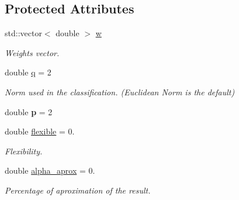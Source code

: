 \subsection*{Protected Attributes}
\begin{DoxyCompactItemize}
\item 
std\+::vector$<$ double $>$ \hyperlink{class_primal_classifier_a6191919f25a037b6a61d00ebda18f41e}{w}\hypertarget{class_primal_classifier_a6191919f25a037b6a61d00ebda18f41e}{}\label{class_primal_classifier_a6191919f25a037b6a61d00ebda18f41e}

\begin{DoxyCompactList}\small\item\em Weights vector. \end{DoxyCompactList}\item 
double \hyperlink{class_primal_classifier_ae30c00c25bce4b1623baa54b5e2812b4}{q} = 2\hypertarget{class_primal_classifier_ae30c00c25bce4b1623baa54b5e2812b4}{}\label{class_primal_classifier_ae30c00c25bce4b1623baa54b5e2812b4}

\begin{DoxyCompactList}\small\item\em Norm used in the classification. (Euclidean Norm is the default) \end{DoxyCompactList}\item 
double {\bfseries p} = 2\hypertarget{class_primal_classifier_ac5b59dafe749376fb067ceda690f405d}{}\label{class_primal_classifier_ac5b59dafe749376fb067ceda690f405d}

\item 
double \hyperlink{class_primal_classifier_a5d41554dc1158ede39d387fecf73c96e}{flexible} = 0.\hypertarget{class_primal_classifier_a5d41554dc1158ede39d387fecf73c96e}{}\label{class_primal_classifier_a5d41554dc1158ede39d387fecf73c96e}

\begin{DoxyCompactList}\small\item\em Flexibility. \end{DoxyCompactList}\item 
double \hyperlink{class_primal_classifier_a2668546ac4a39e10f72cbd2e865c41a7}{alpha\+\_\+aprox} = 0.\hypertarget{class_primal_classifier_a2668546ac4a39e10f72cbd2e865c41a7}{}\label{class_primal_classifier_a2668546ac4a39e10f72cbd2e865c41a7}

\begin{DoxyCompactList}\small\item\em Percentage of aproximation of the result. \end{DoxyCompactList}\end{DoxyCompactItemize}


